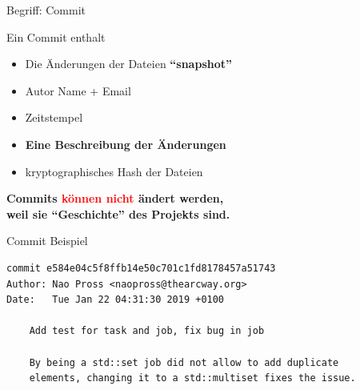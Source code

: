\begin{frame}{Begriff: Commit}
    \begin{block}{Ein Commit enthalt}
    \begin{itemize}
        \item Die \"Anderungen der Dateien \textbf{``snapshot''} \pause
        \item Autor Name + Email \pause
        \item Zeitstempel \pause
        \item \textbf{Eine Beschreibung der \"Anderungen} \pause
        \item kryptographisches Hash der Dateien
    \end{itemize}
    \end{block}

    \pause
	\begin{center}
	\textbf{
		Commits \textcolor{red}{k\"onnen nicht} \"andert werden, \\
    	weil sie ``Geschichte'' des Projekts sind.
	}
    \end{center}
\end{frame}

\begin{frame}[fragile]{Commit Beispiel}
\centering\footnotesize
\begin{verbatim}
commit e584e04c5f8ffb14e50c701c1fd8178457a51743
Author: Nao Pross <naopross@thearcway.org>
Date:   Tue Jan 22 04:31:30 2019 +0100

    Add test for task and job, fix bug in job

    By being a std::set job did not allow to add duplicate
    elements, changing it to a std::multiset fixes the issue.
\end{verbatim}
\end{frame}


